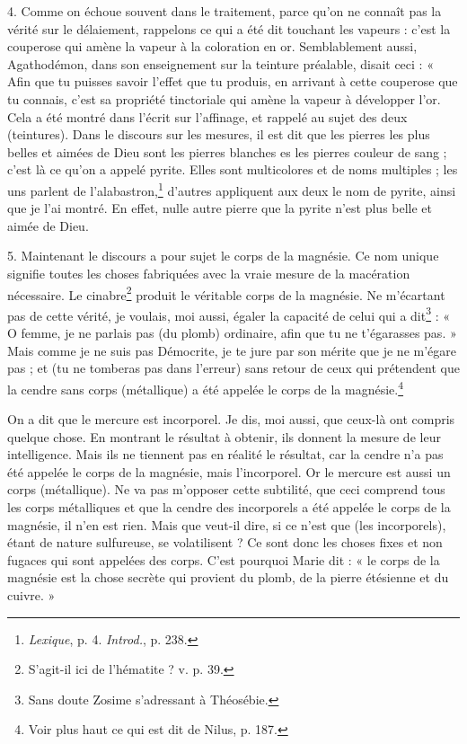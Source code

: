 \documentclass[a4paper, 11pt, oneside, polutonikogreek, french]{article}
\begin{document}
4. Comme on échoue souvent dans le traitement, parce qu'on ne connaît pas la vérité sur le délaiement, rappelons ce qui a été dit touchant les vapeurs : c'est la couperose qui amène la vapeur à la coloration en or. Semblablement aussi, Agathodémon, dans son enseignement sur la teinture préalable, disait ceci : « Afin que tu puisses savoir l'effet que tu produis, en arrivant à cette couperose que tu connais, c'est sa propriété tinctoriale qui amène la vapeur à développer l'or. Cela a été montré dans l'écrit sur l'affinage, et rappelé au sujet des deux (teintures). Dans le discours sur les mesures, il est dit que les pierres les plus belles et aimées de Dieu sont les pierres blanches es les pierres couleur de sang ; c'est là ce qu'on a appelé pyrite. Elles sont multicolores et de noms multiples ; les uns parlent de l'alabastron,\footnote{\emph{Lexique}, p. 4. \emph{Introd.}, p. 238.} d'autres appliquent aux deux le nom de pyrite, ainsi que je l'ai montré. En effet, nulle autre pierre que la pyrite n'est plus belle et aimée de Dieu.

5. Maintenant le discours a pour sujet le corps de la magnésie. Ce nom unique signifie toutes les choses fabriquées avec la vraie mesure de la macération nécessaire. Le cinabre\footnote{S'agit-il ici de l'hématite ? v. p. 39.} produit le véritable corps de la magnésie. Ne m'écartant pas de cette vérité, je voulais, moi aussi, égaler la capacité de celui qui a dit\footnote{Sans doute Zosime s'adressant à Théosébie.} : « O femme, je ne parlais pas (du plomb) ordinaire, afin que tu ne t'égarasses pas. » Mais comme je ne suis pas Démocrite, je te jure par son mérite que je ne m'égare pas ; et (tu ne tomberas pas dans l'erreur) sans retour de ceux qui prétendent que la cendre sans corps (métallique) a été appelée le corps de la magnésie.\footnote{Voir plus haut ce qui est dit de Nilus, p. 187.}

On a dit que le mercure est incorporel. Je dis, moi aussi, que ceux-là ont compris quelque chose. En montrant le résultat à obtenir, ils donnent la mesure de leur intelligence. Mais ils ne tiennent pas en réalité le résultat, car la cendre n'a pas été appelée le corps de la magnésie, mais l'incorporel. Or le mercure est aussi un corps (métallique). Ne va pas m'opposer cette subtilité, que ceci comprend tous les corps métalliques et que la cendre des incorporels a été appelée le corps de la magnésie, il n'en est rien. Mais que veut-il dire, si ce n'est que (les incorporels), étant de nature sulfureuse, se volatilisent ? Ce sont donc les choses fixes et non fugaces qui sont appelées des corps. C'est pourquoi Marie dit : « le corps de la magnésie est la chose secrète qui provient du plomb, de la pierre étésienne et du cuivre. »
\end{document}
